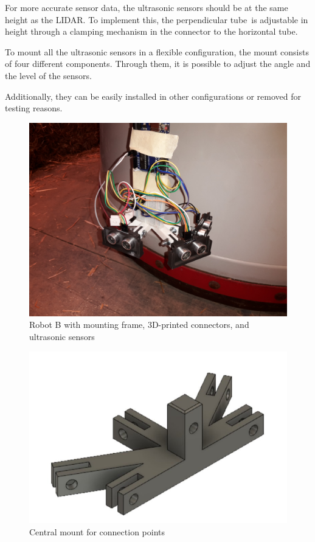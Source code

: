 \documentclass[11pt]{article}
\begin{document}
	For more accurate sensor data, the ultrasonic sensors should be at the same height as the LIDAR. To implement this, the perpendicular tube is adjustable in height through a clamping mechanism in the connector to the horizontal tube. \newline
	
	To mount all the ultrasonic sensors in a flexible configuration, the mount consists of four different components. Through them, it is possible to adjust the angle and the level of the sensors. \newline
	
	Additionally, they can be easily installed in other configurations or removed for testing reasons.
	
	\begin{figure}[h!]
		\centering
		\includegraphics[scale=0.1]{ultrasonic_mount}
		\caption{Robot B with mounting frame, 3D-printed connectors, and ultrasonic sensors}
	\end{figure}
	
	\begin{figure}[h!]
		\centering
		\includegraphics[scale=0.5]{central_mount_empty}
		\caption{Central mount for connection points}
	\end{figure}
\end{document}
